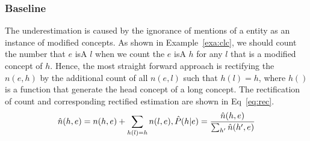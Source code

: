 %
%

\subsubsection{Baseline}
The underestimation is caused by the ignorance of mentions of a entity as an instance of modified concepts. As shown in Example~\ref{exa:clc}, we should count the number that $e$ isA ${l}$ when we count the $e$ isA ${h}$ for any $l$ that is a modified concept of $h$.
Hence, the most straight forward approach is rectifying the $n(e, h)$ by the additional count
of all $n(e, l)$ such that $h(l)=h$, where $h()$ is a function that generate the head concept of a long concept. The rectification of count and corresponding rectified estimation are shown in Eq~\ref{eq:rec}. 
\begin{equation}
\small
\hat{n}(h, e)={n}(h, e)+\sum_{ h(l)=h} n(l,e), \hat{P}(h|e)=\frac{\hat{n}(h, e)}{\sum_{{h'}}{\hat{n}({h'}}, e)}
\label{eq:rec}
\end{equation}


